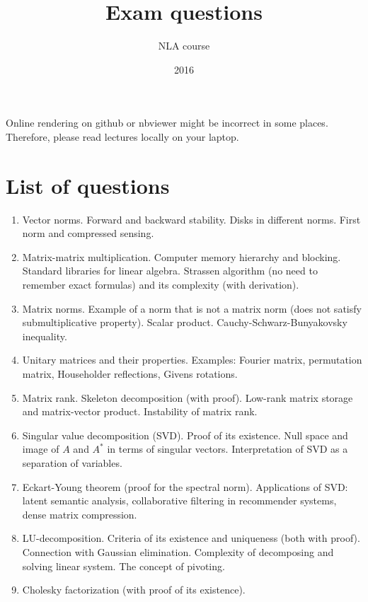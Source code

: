 \documentclass{article}
\title{Exam questions}
\author{NLA course}
\date{2016}
\begin{document}
\maketitle

Online rendering on github or nbviewer might be incorrect in some places. Therefore, please read lectures locally on your laptop.

\section*{List of questions}

\begin{enumerate}
	\item Vector norms. Forward and backward stability. Disks in different norms. First norm and compressed sensing.
	\item Matrix-matrix multiplication. Computer memory hierarchy and blocking. Standard libraries for linear algebra. Strassen algorithm (no need to remember exact formulas) and its complexity (with derivation).
	\item Matrix norms. Example of a norm that is not a matrix norm (does not satisfy submultiplicative property). Scalar product. Cauchy-Schwarz-Bunyakovsky inequality.  
	\item Unitary matrices and their properties. Examples: Fourier matrix, permutation matrix, Householder reflections, Givens rotations.
	\item Matrix rank. Skeleton decomposition (with proof). Low-rank matrix storage and matrix-vector product. Instability of  matrix rank.
	\item Singular value decomposition (SVD). Proof of its existence. Null space and image of $A$ and $A^*$ in terms of singular vectors. Interpretation of SVD as a separation of variables.
	\item Eckart-Young theorem (proof for the spectral norm). Applications of SVD: latent semantic analysis, collaborative filtering in recommender systems, dense matrix compression.
	\item LU-decomposition. Criteria of its existence and uniqueness (both with proof). Connection with Gaussian elimination. Complexity of decomposing and solving linear system. The concept of pivoting.
	\item Cholesky factorization (with proof of its existence).

\end{enumerate}
\end{document}
